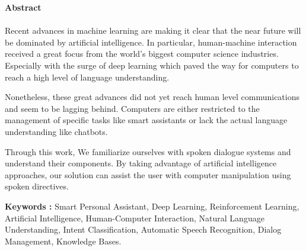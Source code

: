 \vspace*{0.8cm}

\newpage
\clearpage
\begin{center}
    \Large 
    \textbf{Abstract}
\end{center}

\paragraph{}
Recent advances in machine learning are making it clear that the near future will be dominated by artificial intelligence. In particular, human-machine interaction received a great focus from the world's biggest computer science industries. Especially with the surge of deep learning which paved the way for computers to reach a high level of language understanding.

Nonetheless, these great advances did not yet reach human level communications and seem to be lagging behind. Computers are either restricted to the management of specific tasks like smart assistants or lack the actual language understanding like chatbots.

Through this work, We familiarize ourselves with spoken dialogue systems and understand their components. By taking advantage of artificial intelligence approaches, our solution can assist the user with computer manipulation using spoken directives.

\noindent
\textbf{Keywords :} Smart Personal Assistant, Deep Learning, Reinforcement Learning, Artificial Intelligence, Human-Computer Interaction, Natural Language Understanding, Intent Classification, Automatic Speech Recognition, Dialog Management, Knowledge Bases.